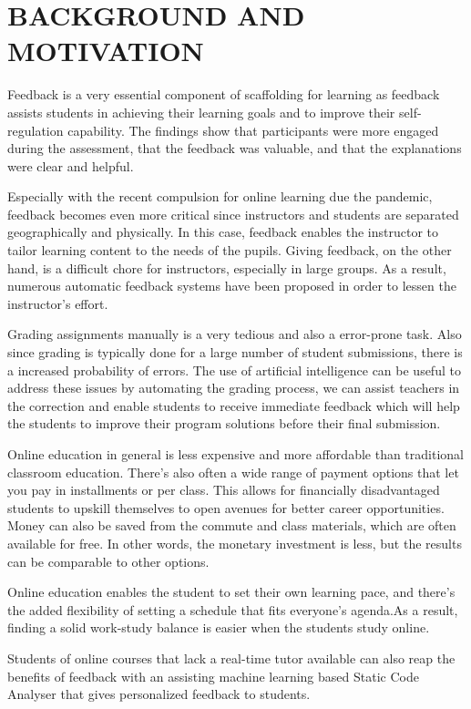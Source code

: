 
\chapter{BACKGROUND AND MOTIVATION} %
%

Feedback is a very essential component of scaffolding for learning as feedback assists students in achieving their learning goals and to improve their self-regulation capability. The findings show that participants were more engaged during the assessment, that the feedback was valuable, and that the explanations were clear and helpful.

Especially with the recent compulsion for online learning due the pandemic, feedback becomes even more critical since instructors and students are separated geographically and physically. In this case, feedback enables the instructor to tailor learning content to the needs of the pupils. Giving feedback, on the other hand, is a difficult chore for instructors, especially in large groups. As a result, numerous automatic feedback systems have been proposed in order to lessen the instructor's effort. 

Grading assignments manually is a very tedious and also a error-prone task. Also since grading is typically done for a large number of student submissions, there is a increased probability of errors. The use of artificial intelligence can be useful to address these issues by automating the grading process, we can assist teachers in the correction and enable students to receive immediate feedback which will help the students to improve their program solutions before their final submission.

Online education in general is less expensive and more affordable than traditional classroom education. There’s also often a wide range of payment options that let you pay in installments or per class. This allows for financially disadvantaged students to upskill themselves to open avenues for better career opportunities. Money can also be saved from the commute and class materials, which are often available for free. In other words, the monetary investment is less, but the results can be comparable to other options. 

Online education enables the student to set their own learning pace, and there’s the added flexibility of setting a schedule that fits everyone’s agenda.As a result, finding a solid work-study balance is easier when the students study online. 

Students of online courses that lack a real-time tutor available can also reap the benefits of feedback with an assisting machine learning based Static Code Analyser that gives personalized feedback to students. 


